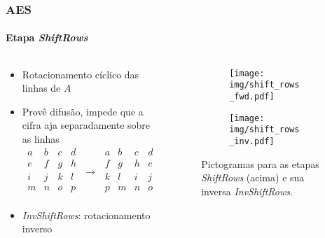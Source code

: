 \documentclass[12pt]{beamer}
\begin{document}
\begin{frame}
    \frametitle{AES}
    \framesubtitle{Etapa \emph{ShiftRows}}
    \begin{columns}[T]
        \begin{column}{.7\textwidth}
          \begin{itemize}
            \item Rotacionamento cíclico das linhas de $A$
            \item Provê difusão, impede que a cifra aja separadamente sobre as linhas
            \begin{equation*}
                \begin{matrix}
                    a & b & c & d \\
                    e & f & g & h \\
                    i & j & k & l \\
                    m & n & o & p \\
                \end{matrix} \; \longrightarrow \;
                \begin{matrix}
                    a & b & c & d \\
                    f & g & h & e \\
                    k & l & i & j \\
                    p & m & n & o \\
                \end{matrix}
            \end{equation*}
            \item \emph{InvShiftRows}: rotacionamento inverso
          \end{itemize}
        \end{column}
        \begin{column}{.25\textwidth}
            \begin{figure}
            \centering
            \begin{subfigure}[b]{0.7\textwidth}
               \texttt{[image: img/shift\_rows\_fwd.pdf]}
               \vspace{2mm}
            \end{subfigure}
            
            \begin{subfigure}[b]{0.7\textwidth}
               \texttt{[image: img/shift\_rows\_inv.pdf]}
            \end{subfigure}
                    \captionsetup{font=scriptsize}
        
            \caption*{Pictogramas para as etapas \emph{ShiftRows} (acima) e sua inversa \emph{InvShiftRows}.}
            \end{figure}
        \end{column}
    \end{columns}
\end{frame}
\end{document}
